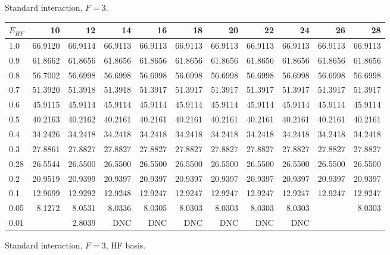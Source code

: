 \begin{landscape}
\begin{table}
\begin{center}
Standard interaction, $F=3$.\\
\begin{tabular}{l|rrrrrrrrrr}
\hline 
$E_{HF}$ & 10 & 12 & 14 & 16 & 18 & 20 & 22 & 24 & 26 & 28 \\
\hline \hline
1.0 & 66.9120 & 66.9114 & 66.9113 & 66.9113 & 66.9113 & 66.9113 & 66.9113 & 66.9113 & 66.9113  & 66.9113 \\ 
0.9 & 61.8662 & 61.8656 & 61.8656 & 61.8656 & 61.8656 & 61.8656 & 61.8656 & 61.8656 & 61.8656  & 61.8656 \\ 
0.8 & 56.7002 & 56.6998 & 56.6998 & 56.6998 & 56.6998 & 56.6998 & 56.6998 & 56.6998 & 56.6998  & 56.6998 \\ 
0.7 & 51.3920 & 51.3918 & 51.3918 & 51.3917 & 51.3917 & 51.3917 & 51.3917 & 51.3917 & 51.3917  & 51.3917 \\ 
0.6 & 45.9115 & 45.9114 & 45.9114 & 45.9114 & 45.9114 & 45.9114 & 45.9114 & 45.9114 & 45.9114  & 45.9114 \\ 
0.5 & 40.2163 & 40.2162 & 40.2161 & 40.2161 & 40.2161 & 40.2161 & 40.2161 & 40.2161 & 40.2161  & 40.2161 \\ 
0.4 & 34.2426 & 34.2418 & 34.2418 & 34.2418 & 34.2418 & 34.2418 & 34.2418 & 34.2418 & 34.2418  & 34.2418 \\ 
0.3 & 27.8861 & 27.8827 & 27.8827 & 27.8827 & 27.8827 & 27.8827 & 27.8827 & 27.8827 & 27.8827  & 27.8827 \\ 
0.28& 26.5544 & 26.5500 & 26.5500 & 26.5500 & 26.5500 & 26.5500 & 26.5500 & 26.5500 & 26.5500  & 26.5500 \\ 
0.2 & 20.9519 & 20.9399 & 20.9397 & 20.9397 & 20.9397 & 20.9397 & 20.9397 & 20.9397 & 20.9397  & 20.9397 \\ 
0.1 & 12.9699 & 12.9292 & 12.9248 & 12.9247 & 12.9247 & 12.9247 & 12.9247 & 12.9247 & 12.9247  & 12.9247 \\ 
0.05&  8.1272 &  8.0531 &  8.0336 &  8.0305 &  8.0303 &  8.0303 &  8.0303 &  8.0303 &          &  8.0303 \\
0.01&  	      &  2.8039 & DNC     & DNC     & DNC     & DNC     &   DNC   & DNC     &  \\ 
\hline \hline
\end{tabular}
\end{center}
\begin{center}
Standard interaction, $F=3$, HF basis.\\

\end{center}
\end{table}
\end{landscape}
